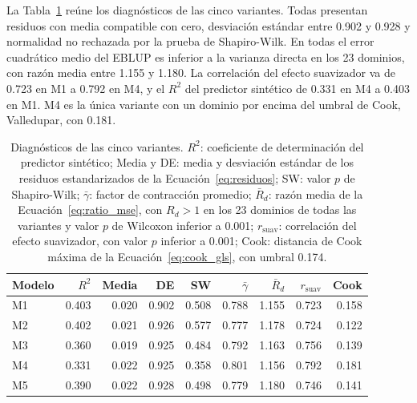     La Tabla~\ref{tab:diagnosticos_variantes} reúne los diagnósticos de las cinco variantes. Todas presentan residuos con media compatible con cero, desviación estándar entre 0.902 y 0.928 y normalidad no rechazada por la prueba de Shapiro-Wilk. En todas el error cuadrático medio del EBLUP es inferior a la varianza directa en los 23 dominios, con razón media entre 1.155 y 1.180. La correlación del efecto suavizador va de 0.723 en M1 a 0.792 en M4, y el $R^2$ del predictor sintético de 0.331 en M4 a 0.403 en M1. M4 es la única variante con un dominio por encima del umbral de Cook, Valledupar, con 0.181.

    \begin{table}[!htbp]
    \centering
    \small
    \caption{Diagnósticos de las cinco variantes. $R^2$: coeficiente de determinación del predictor
             sintético; Media y DE: media y desviación estándar de los residuos estandarizados de
             la Ecuación~\ref{eq:residuos}; SW: valor $p$ de Shapiro-Wilk; $\bar{\gamma}$: factor
             de contracción promedio; $\bar{R}_d$: razón media de la Ecuación~\ref{eq:ratio_mse},
             con $R_d > 1$ en los 23 dominios de todas las variantes y valor $p$ de Wilcoxon
             inferior a 0.001; $r_{\text{suav}}$: correlación del efecto suavizador, con valor $p$
             inferior a 0.001; Cook: distancia de Cook máxima de la Ecuación~\ref{eq:cook_gls},
             con umbral 0.174.}
    \label{tab:diagnosticos_variantes}
    \renewcommand{\arraystretch}{1.25}
    \begin{tabular}{l r r r r r r r r}
    \toprule
    \textbf{Modelo} & \textbf{$R^2$} & \textbf{Media} & \textbf{DE} & \textbf{SW} &
    \textbf{$\bar{\gamma}$} & \textbf{$\bar{R}_d$} & \textbf{$r_{\text{suav}}$} & \textbf{Cook} \\
    \midrule
    M1 & 0.403 & 0.020 & 0.902 & 0.508 & 0.788 & 1.155 & 0.723 & 0.158 \\
    M2 & 0.402 & 0.021 & 0.926 & 0.577 & 0.777 & 1.178 & 0.724 & 0.122 \\
    M3 & 0.360 & 0.019 & 0.925 & 0.484 & 0.792 & 1.163 & 0.756 & 0.139 \\
    M4 & 0.331 & 0.022 & 0.925 & 0.358 & 0.801 & 1.156 & 0.792 & 0.181 \\
    M5 & 0.390 & 0.022 & 0.928 & 0.498 & 0.779 & 1.180 & 0.746 & 0.141 \\
    \bottomrule
    \end{tabular}
    \end{table}
    \FloatBarrier

